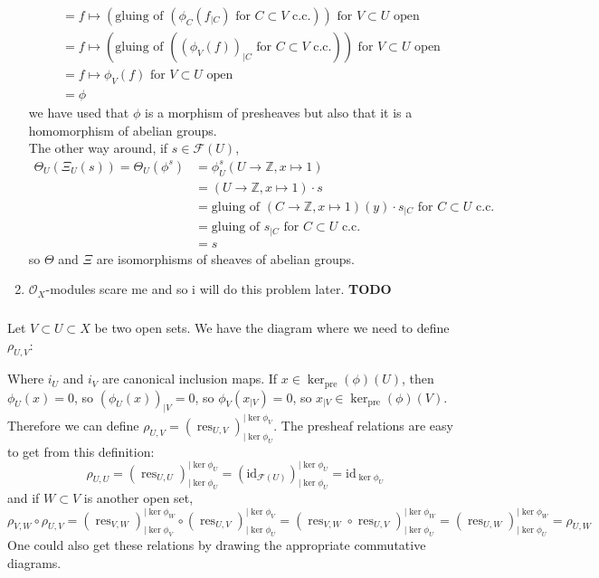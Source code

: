 \documentclass{article}
\newcommand{\id}{\mathrm{id}}
\newcommand{\pre}{\mathrm{pre}}
\newcommand{\Z}{\mathbb{Z}}
\DeclareMathOperator{\res}{res}
\newcommand{\todo}{\textbf{TODO}}
\newcommand{\Osheaf}{\mathscr{O}}
\newcommand{\Fsheaf}{\mathscr{F}}
\newcommand{\Gsheaf}{\mathscr{G}}
\newcommand{\exercise}{\subsubsection} %
\begin{document}
\begin{enumerate}
\begin{align*}
        & = f \mapsto (\text{gluing of } (\phi_C (f_{\mid C}) \text{ for $C \subset V$ c.c.})) \text{ for $V \subset U$ open} \\
        & = f \mapsto (\text{gluing of } ((\phi_V (f))_{\mid C} \text{ for $C \subset V$ c.c.})) \text{ for $V \subset U$ open} \\
        & = f \mapsto \phi_V(f) \text{ for $V \subset U$ open} \\
        & = \phi
    \end{align*}
    we have used that $\phi$ is a morphism of presheaves but also that it is a homomorphism of abelian groups. \\
    The other way around, if $s \in \Fsheaf(U)$,
    \begin{align*}
        \Theta_U (\Xi_U (s)) = \Theta_U(\phi^s) & = \phi^s_U (U \to \Z,x \mapsto 1) \\
        & = (U \to \Z,x \mapsto 1) \cdot s \\
        & = \text{gluing of } (C \to \Z,x \mapsto 1)(y) \cdot s_{\mid C} \text{ for $C \subset U$ c.c.} \\
        & = \text{gluing of } s_{\mid C} \text{ for $C \subset U$ c.c.} \\
        & = s
    \end{align*}
    so $\Theta$ and $\Xi$ are isomorphisms of sheaves of abelian groups.
    \item $\Osheaf_X$-modules scare me and so i will do this problem later. \todo
\end{enumerate}

\exercise{} Let $V \subset U \subset X$ be two open sets. We have the diagram where we need to define $\rho_{U,V}$:
\begin{center}
\end{center}
Where $i_U$ and $i_V$ are canonical inclusion maps. If $x \in \ker_{\pre}(\phi)(U)$, then $\phi_U(x) = 0$, so $(\phi_U(x))_{\mid V} = 0$, so $\phi_V(x_{\mid V}) = 0$, so $x_{\mid V} \in \ker_{\pre}(\phi)(V)$. Therefore we can define $\rho_{U,V} = (\res_{U,V})_{\mid \ker \phi_U}^{\mid \ker \phi_V}$. The presheaf relations are easy to get from this definition:
\[\rho_{U,U} = (\res_{U,U})_{\mid \ker \phi_U}^{\mid \ker \phi_U} = (\id_{\Fsheaf(U)})_{\mid \ker \phi_U}^{\mid \ker \phi_U} = \id_{\ker \phi_U}\]
and if $W \subset V$ is another open set,
\[\rho_{V,W} \circ \rho_{U,V} = (\res_{V,W})_{\mid \ker \phi_V}^{\mid \ker \phi_W} \circ (\res_{U,V})_{\mid \ker \phi_U}^{\mid \ker \phi_V} = (\res_{V,W} \circ \res_{U,V})_{\mid \ker \phi_U}^{\mid \ker \phi_W} = (\res_{U,W})_{\mid \ker \phi_U}^{\mid \ker \phi_W} =\rho_{U,W}\]
One could also get these relations by drawing the appropriate commutative diagrams.
\end{document}
